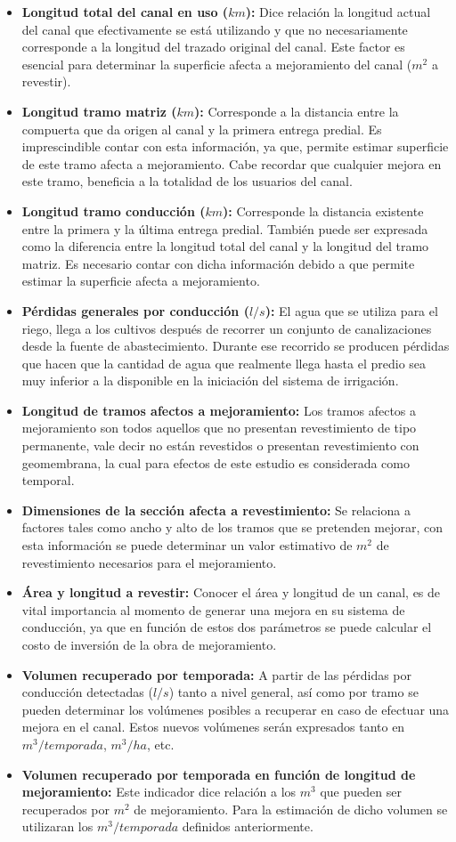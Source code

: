 \documentclass[]{article}
\begin{document}
\begin{itemize}
\item \textbf{Longitud total del canal en uso ($km$):} Dice relación la longitud actual del canal que efectivamente se está utilizando y que no necesariamente corresponde a la longitud del trazado original del canal. Este factor es esencial para determinar la superficie afecta a mejoramiento del canal ($m^2$ a revestir).
\item \textbf{Longitud tramo matriz ($km$):} Corresponde a la distancia entre la compuerta que da origen al canal y la primera entrega predial. Es imprescindible contar con esta información, ya que, permite estimar superficie de este tramo afecta a mejoramiento. Cabe recordar que cualquier mejora en este tramo, beneficia a la totalidad de los usuarios del canal.
\item \textbf{Longitud tramo conducción ($km$):} Corresponde la distancia existente entre la primera y la última entrega predial. También puede ser expresada como la diferencia entre la longitud total del canal y la longitud del tramo matriz. Es necesario contar con dicha información debido a que permite estimar la superficie afecta a mejoramiento.
\item \textbf{Pérdidas generales por conducción ($l/s$):} El agua que se utiliza para el riego, llega a los cultivos después de recorrer un conjunto de canalizaciones desde la fuente de abastecimiento. Durante ese recorrido se producen pérdidas que hacen que la cantidad de agua que realmente llega hasta el predio sea muy inferior a la disponible en la iniciación del sistema de irrigación.
\item \textbf{Longitud de tramos afectos a mejoramiento:} Los tramos afectos a mejoramiento son todos aquellos que no presentan revestimiento de tipo permanente, vale decir no están revestidos o presentan revestimiento con geomembrana, la cual para efectos de este estudio es considerada como temporal.
\item \textbf{Dimensiones de la sección afecta a revestimiento:} Se relaciona a factores tales como ancho y alto de los tramos que se pretenden mejorar, con esta información se puede determinar un valor estimativo de $m^2$ de revestimiento necesarios para el mejoramiento.
\item \textbf{Área y longitud a revestir:} Conocer el área y longitud de un canal, es de vital importancia al momento de generar una mejora en su sistema de conducción, ya que en función de estos dos parámetros se puede calcular el costo de inversión de la obra de mejoramiento.
\item \textbf{Volumen recuperado por temporada:} A partir de las pérdidas por conducción detectadas ($l/s$) tanto a nivel general, así como por tramo se pueden determinar los volúmenes posibles a recuperar en caso de efectuar una mejora en el canal. Estos nuevos volúmenes serán expresados tanto en $m^3/temporada$, $m^3/ha$, etc.
\item \textbf{Volumen recuperado por temporada en función de longitud de mejoramiento:} Este indicador dice relación a los $m^3$ que pueden ser recuperados por $m^2$ de mejoramiento. Para la estimación de dicho volumen se utilizaran los $m^3/temporada$ definidos anteriormente.
\end{itemize}
\end{document}
